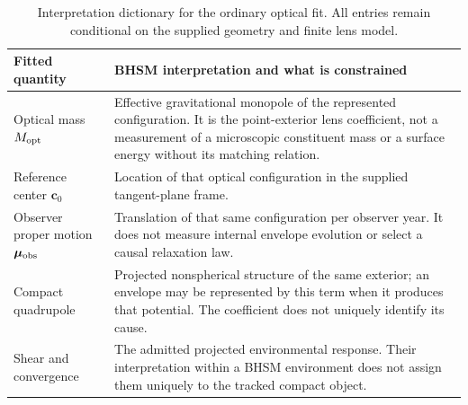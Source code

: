 \begin{table}[tbp]
\centering\small
\caption{Interpretation dictionary for the ordinary optical fit. All
entries remain conditional on the supplied geometry and finite lens model.}
\label{tab:bhsm-interpretation}
\begin{tabular}{@{}p{.23\linewidth}p{.71\linewidth}@{}}
\toprule
Fitted quantity & BHSM interpretation and what is constrained\\\midrule
Optical mass $M_{\rm opt}$ & Effective gravitational monopole of the
represented configuration. It is the point-exterior lens coefficient,
not a measurement of a microscopic constituent mass or a surface energy
without its matching relation.\\
Reference center $\boldsymbol c_0$ & Location of that optical
configuration in the supplied tangent-plane frame.\\
Observer proper motion $\boldsymbol\mu_{\rm obs}$ & Translation of
that same configuration per observer year. It does not measure internal
envelope evolution or select a causal relaxation law.\\
Compact quadrupole & Projected nonspherical structure of the same
exterior; an envelope may be represented by this term when it produces
that potential. The coefficient does not uniquely identify its cause.\\
Shear and convergence & The admitted projected environmental response.
Their interpretation within a BHSM environment does not assign them
uniquely to the tracked compact object.\\\bottomrule
\end{tabular}
\end{table}

